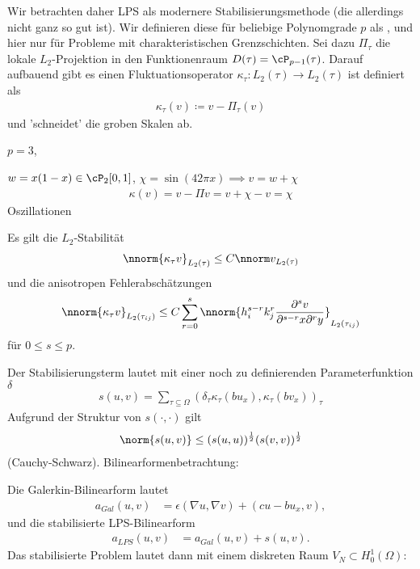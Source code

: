 Wir betrachten daher LPS als modernere Stabilisierungsmethode (die allerdings nicht ganz so gut ist). Wir definieren diese für beliebige Polynomgrade $p$ als , und hier nur für Probleme mit charakteristischen Grenzschichten. Sei dazu $\Pi_{\tau}$ die lokale $L_{2}$-Projektion in den Funktionenraum $D(\tau) = \cP_{p-1}(\tau)$. Darauf aufbauend gibt es einen Fluktuationsoperator $\kappa_{\tau}: L_{2}(\tau) \to L_{2}(\tau)$ ist definiert als
\begin{align*}
  \kappa_{\tau}(v) \coloneqq v - \Pi_{\tau}(v)
\end{align*}
und 'schneidet' die groben Skalen ab. 
\begin{beispiel*} $p = 3$, 

  $w = x(1 - x)\in \cP_{2}[0, 1]$, $\chi = \sin(42 \pi x) \implies v = w +\chi$
  \begin{align*}
    \kappa(v) = v - \Pi v = v + \chi - v = \chi
  \end{align*}
Oszillationen
\end{beispiel*}
Es gilt die $L_{2}$-Stabilität
\begin{align*}
  \nnorm{\kappa_{\tau}v}_{L_{2}(\tau)} \leq C \nnorm v _{L_{2}(\tau)} 
\end{align*}
und die anisotropen Fehlerabschätzungen
\begin{align*}
  \nnorm{\kappa_{\tau} v}_{L_{2}(\tau_{ij})} \leq C \sum_{r = 0}^{s} \nnorm{h^{s-r}_{i} k_{j}^{r} \frac{\partial^{s} v}{\partial^{s-r} x\partial^{r}y}}_{L_{2}(\tau_{ij})}
\end{align*}
für $0 \leq s \leq p$. 

Der Stabilisierungsterm lautet mit einer noch zu definierenden Parameterfunktion $\delta$
\begin{align*}
  s(u, v) = \sum_{\tau \subseteq \Omega} (\delta_{\tau}\kappa_{\tau}(bu_{x}), \kappa_{\tau}(b v_{x}))_{\tau}
\end{align*}
Aufgrund der Struktur von $s(\cdot, \cdot)$ gilt
\begin{align*}
  \norm{s(u, v)} \leq (s(u, u))^{\frac 12} (s(v, v))^{\frac 12}
\end{align*}
(Cauchy-Schwarz). 
Bilinearformenbetrachtung: 

Die Galerkin-Bilinearform lautet
\begin{align*}
  a_{Gal}(u, v) &= \epsilon(\nabla u, \nabla v) + (c u - bu_{x}, v), 
\end{align*}
und die stabilisierte LPS-Bilinearform
\begin{align*}
  a_{LPS}(u, v) &= a_{Gal}(u, v) + s(u, v). 
\end{align*}
Das stabilisierte Problem lautet dann mit einem diskreten Raum $V_{N} \subset H_{0}^{1}(\Omega)$: 

